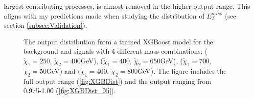 largest contributing processes, is almost removed in the higher output range. This aligns with my predictions made when studying the 
distribution of $E_T^{miss}$ (see section \ref{subsec:Validation}). 
\begin{figure}
    \caption[The output distribution from a trained XGBoost model for the background and signals with 4 different mass combination.]{
    The output distribution from a trained XGBoost model for the background and signals with 4 different mass combinations:
    ($\tilde{\chi}_1=250$, $\tilde{\chi}_2=400$GeV), ($\tilde{\chi}_1=400$, $\tilde{\chi}_2=650$GeV), 
    ($\tilde{\chi}_1=700$, $\tilde{\chi}_2=50$GeV) and ($\tilde{\chi}_1=400$, $\tilde{\chi}_2=800$GeV). 
    The figure includes the full output range (\ref{fig:XGBDist}) and the output ranging from 0.975-1.00 (\ref{fig:XGBDist_95}).}
    \label{fig:XGBDistComp}
\end{figure}
